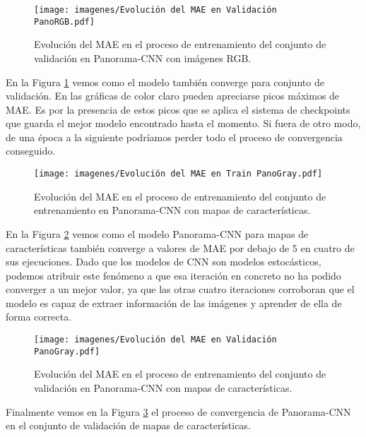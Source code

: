 \begin{figure}[ht]
    \centering
    \texttt{[image: imagenes/Evolución del MAE en Validación PanoRGB.pdf]}
    \caption[Evolución del MAE en el conjunto de validación en Panorama-CNN con imágenes RGB.]{Evolución del MAE en el proceso de entrenamiento del conjunto de validación en Panorama-CNN con imágenes RGB.}
    \label{fig:maevalpanorgb}
\end{figure}

En la Figura \ref{fig:maevalpanorgb} vemos como el modelo también converge para conjunto de validación. En las gráficas de color claro pueden apreciarse picos máximos de MAE. Es por la presencia de estos picos que se aplica el sistema de checkpoints que guarda el mejor modelo encontrado hasta el momento. Si fuera de otro modo, de una época a la siguiente podríamos perder todo el proceso de convergencia conseguido.

\begin{figure}[ht]
    \centering
    \texttt{[image: imagenes/Evolución del MAE en Train PanoGray.pdf]}
    \caption[Evolución del MAE en el conjunto de entrenamiento en Panorama-CNN con mapas de características.]{Evolución del MAE en el proceso de entrenamiento del conjunto de entrenamiento en Panorama-CNN con mapas de características.}
    \label{fig:maetrainpanogray}
\end{figure}

En la Figura \ref{fig:maetrainpanogray} vemos como el modelo Panorama-CNN para mapas de características también converge a valores de MAE por debajo de 5 en cuatro de sus ejecuciones. Dado que los modelos de CNN son modelos estocásticos, podemos atribuir este fenómeno a que esa iteración en concreto no ha podido converger a un mejor valor, ya que las otras cuatro iteraciones corroboran que el modelo es capaz de extraer información de las imágenes y aprender de ella de forma correcta.

\begin{figure}[ht]
    \centering
    \texttt{[image: imagenes/Evolución del MAE en Validación PanoGray.pdf]}
    \caption[Evolución del MAE en el conjunto de validación en Panorama-CNN con mapas de características.]{Evolución del MAE en el proceso de entrenamiento del conjunto de validación en Panorama-CNN con mapas de características.}
    \label{fig:maevalpanogray}
\end{figure}

Finalmente vemos en la Figura \ref{fig:maevalpanogray} el proceso de convergencia de Panorama-CNN en el conjunto de validación de mapas de características.
\newpage

